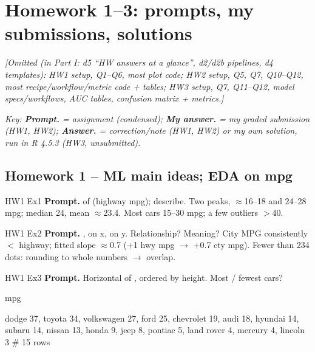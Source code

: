 \section{Homework 1--3: prompts, my submissions, solutions}
%
{\color{figgray}\itshape [Omitted (in Part I: d5 ``HW answers at a glance'', d2/d2b pipelines, d4 templates): HW1 setup, Q1--Q6, most plot code; HW2 setup, Q5, Q7, Q10--Q12, most recipe/workflow/metric code + tables; HW3 setup, Q7, Q11--Q12, model specs/workflows, AUC tables, confusion matrix + metrics.]}

{\color{figgray}\itshape Key: \textbf{Prompt.} = assignment (condensed); \textbf{\color{dblue}My answer.} = my graded submission (HW1, HW2); \textbf{\color{keyc}Answer.} = correction/note (HW1, HW2) or my own solution, run in R 4.5.3 (HW3, unsubmitted).}

\subsection{Homework 1 -- ML main ideas; EDA on mpg}
%
\begin{qbox}{HW1 Ex1}
\textbf{Prompt.}  of  (highway mpg); describe.
\mine
{}
Two peaks, $\approx$16--18 and 24--28 mpg; median 24, mean $\approx$23.4. Most cars 15--30 mpg; a few outliers $>40$.
\end{qbox}

\begin{qbox}{HW1 Ex2}
\textbf{Prompt.} ,  on x,  on y. Relationship? Meaning?
\mine
{}
City MPG consistently $<$ highway; fitted slope $\approx$0.7 (+1 hwy mpg $\to$ +0.7 cty mpg). Fewer than 234 dots: rounding to whole numbers $\to$ overlap.
\end{qbox}

\begin{qbox}{HW1 Ex3}
\textbf{Prompt.} Horizontal  of , ordered by height. Most / fewest cars?
\mine
\begin{rcode}
mpg %
\end{rcode}
\begin{routput}
dodge 37, toyota 34, volkswagen 27, ford 25, chevrolet 19,
audi 18, hyundai 14, subaru 14, nissan 13, honda 9, jeep 8,
pontiac 5, land rover 4, mercury 4, lincoln 3   # 15 rows
\end{routput}
\end{qbox}

